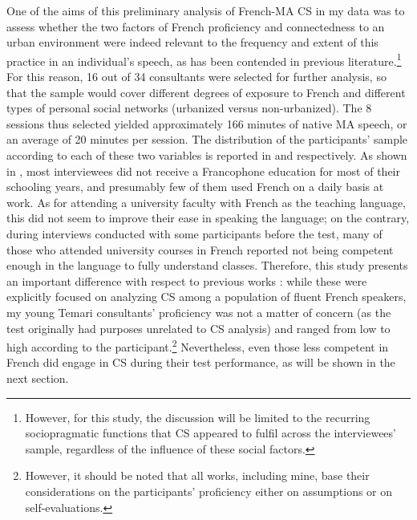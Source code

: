 \documentclass[output=paper]{langscibook}
\begin{document}
One of the aims of this preliminary analysis of French-\gls*{MA} \gls*{CS} in my data was to assess whether the two factors of French proficiency and connectedness to an urban environment were indeed relevant to the frequency and extent of this practice in an individual’s speech, as has been contended in previous literature.\footnote{However, for this study, the discussion will be limited to the recurring sociopragmatic functions that \gls*{CS} appeared to fulfil across the interviewees’ sample, regardless of the influence of these social factors.} For this reason, 16 out of 34 consultants were selected for further analysis, so that the sample would cover different degrees of exposure to French and different types of personal social networks (urbanized versus non-urbanized). The 8 sessions thus selected yielded approximately 166 minutes of native \gls*{MA} speech, or an average of 20 minutes per session. The distribution of the participants’ sample according to each of these two variables is reported in  and  respectively. As shown in , most interviewees did not receive a Francophone education for most of their schooling years, and presumably few of them used French on a daily basis at work. As for attending a university faculty with French as the teaching language, this did not seem to improve their ease in speaking the language; on the contrary, during interviews conducted with some participants before the test, many of those who attended university courses in French reported not being competent enough in the language to fully understand classes. Therefore, this study presents an important difference with respect to previous works \citep{abbassi_sociolinguistic_1977,bentahila_syntax_1983,bentahila_patterns_1995,lahlou_morpho-syntactic_1991, ziamari_development_2007, ziamari_moroccan_2009, ziamari_determiner_2018}: while these were explicitly focused on analyzing \gls*{CS} among a population of fluent French speakers, my young Temari consultants’ proficiency was not a matter of concern (as the test originally had purposes unrelated to \gls*{CS} analysis) and ranged from low to high according to the participant.\footnote{However, it should be noted that all works, including mine, base their considerations on the participants’ proficiency either on assumptions or on self-evaluations.} Nevertheless, even those less competent in French did engage in \gls*{CS} during their test performance, as will be shown in the next section.
\end{document}
